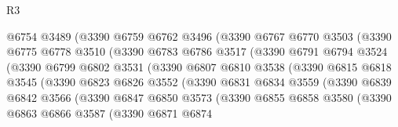 \begin{lexlean}{R3}
\begin{coremodule}
                      @6754
                      @3489
                      (@3390
                        @6759
                        @6762
                        @3496
                        (@3390
                          @6767
                          @6770
                          @3503
                          (@3390
                            @6775
                            @6778
                            @3510
                            (@3390
                              @6783
                              @6786
                              @3517
                              (@3390
                                @6791
                                @6794
                                @3524
                                (@3390
                                  @6799
                                  @6802
                                  @3531
                                  (@3390
                                    @6807
                                    @6810
                                    @3538
                                    (@3390
                                      @6815
                                      @6818
                                      @3545
                                      (@3390
                                        @6823
                                        @6826
                                        @3552
                                        (@3390
                                          @6831
                                          @6834
                                          @3559
                                          (@3390
                                            @6839
                                            @6842
                                            @3566
                                            (@3390
                                              @6847
                                              @6850
                                              @3573
                                              (@3390
                                                @6855
                                                @6858
                                                @3580
                                                (@3390
                                                  @6863
                                                  @6866
                                                  @3587
                                                  (@3390
                                                    @6871
                                                    @6874

\end{coremodule}
\end{lexlean}
